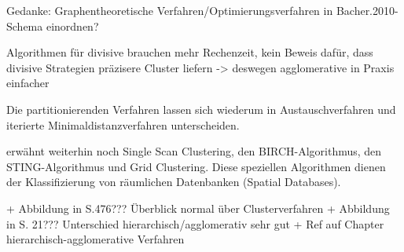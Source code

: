 Gedanke: Graphentheoretische Verfahren/Optimierungsverfahren in Bacher.2010-Schema einordnen?

\cite{Pedrycz.2010} Algorithmen für divisive brauchen mehr Rechenzeit, kein Beweis dafür, dass divisive Strategien präzisere Cluster liefern -> deswegen agglomerative in Praxis einfacher

Die partitionierenden Verfahren lassen sich wiederum in Austauschverfahren und iterierte Minimaldistanzverfahren unterscheiden.

\cite{Xu.1999} erwähnt weiterhin noch Single Scan Clustering, den BIRCH-Algorithmus, den STING-Algorithmus und Grid Clustering. Diese speziellen Algorithmen dienen der Klassifizierung von räumlichen Datenbanken (Spatial Databases).

+ Abbildung in \cite{Backhaus.2016} S.476??? Überblick normal über Clusterverfahren
+ Abbildung in \cite{Xu.1999} S. 21??? Unterschied hierarchisch/agglomerativ sehr gut
+ Ref auf Chapter hierarchisch-agglomerative Verfahren